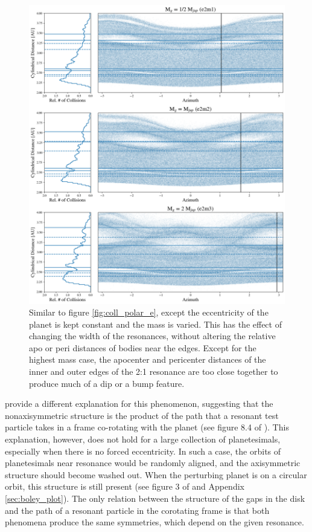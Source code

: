\documentclass[twocolumn]{aastex63}
\begin{document}
\begin{figure}
    \includegraphics[width=\textwidth]{figures/coll_polar_m.png}
    \caption{Similar to figure \ref{fig:coll_polar_e}, except the eccentricity of the planet is kept constant and the mass is varied.
    This has the effect of changing the width of the resonances, without altering the relative apo or peri distances of
    bodies near the edges. Except for the highest mass case, the apocenter and pericenter distances of the inner and outer edges of the 2:1 
    resonance are too close together to produce much of a dip or a bump feature.\label{fig:coll_polar_m}}
\end{figure}

\citet{2016ApJ...818..159T} provide a different explanation for this phenomenon, suggesting that the nonaxisymmetric structure is the product 
of the path that a resonant test particle takes in a frame co-rotating with the planet (see figure 8.4 of \citet{2000ssd..book.....M}). This explanation, 
however, does not hold for a large collection of planetesimals, especially when there is no forced eccentricity. In such a case, the orbits of 
planetesimals near resonance would be randomly aligned, and the axisymmetric structure should become washed out. When the perturbing 
planet is on a circular orbit, this structure is still present (see figure 3 of \citet{2016ApJ...818..159T} and Appendix \ref{sec:boley_plot}). The only 
relation between the structure of the gaps in the disk and the path of a resonant particle in the corotating frame is that both phenomena produce the 
same symmetries, which depend on the given resonance.
\end{document}
